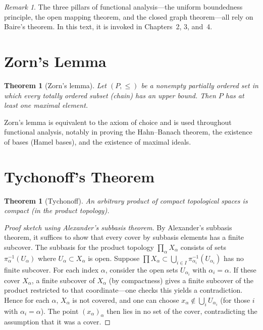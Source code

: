 \documentclass[a4paper,12pt]{book}
\theoremstyle{definition}
\theoremstyle{plain}
\newtheorem{theorem}[definition]{Theorem}
\theoremstyle{remark}
\newtheorem{remark}[definition]{Remark}
\begin{document}
\begin{remark}\label{rem:baire-applications}
The three pillars of functional analysis---the uniform boundedness principle,
the open mapping theorem, and the closed graph theorem---all rely on Baire's
theorem. In this text, it is invoked in Chapters~2, 3, and~4.
\end{remark}


\section{Zorn's Lemma}\label{sec:zorn}


\begin{theorem}[Zorn's lemma]\label{thm:zorn}
Let $(P, \le)$ be a nonempty partially ordered set in which every totally
ordered subset (chain) has an upper bound. Then $P$ has at least one maximal
element.
\end{theorem}

Zorn's lemma is equivalent to the axiom of choice and
is used throughout functional analysis, notably in proving the Hahn--Banach
theorem, the existence of bases (Hamel bases), and the existence of maximal
ideals.


\section{Tychonoff's Theorem}\label{sec:tychonoff}


\begin{theorem}[Tychonoff]\label{thm:tychonoff}
An arbitrary product of compact topological spaces is compact (in the product
topology).
\end{theorem}

\begin{proof}[Proof sketch using Alexander's subbasis theorem]
By Alexander's subbasis theorem, it suffices to show that every cover by
subbasis elements has a finite subcover. The subbasis for the product topology
$\prod_\alpha X_\alpha$ consists of sets $\pi_\alpha^{-1}(U_\alpha)$ where
$U_\alpha \subset X_\alpha$ is open. Suppose $\prod X_\alpha \subset
\bigcup_{i \in I} \pi_{\alpha_i}^{-1}(U_{\alpha_i})$ has no finite subcover.
For each index $\alpha$, consider the open sets $U_{\alpha_i}$ with
$\alpha_i = \alpha$. If these cover $X_\alpha$, a finite subcover of $X_\alpha$
(by compactness) gives a finite subcover of the product restricted to that
coordinate---one checks this yields a contradiction. Hence for each $\alpha$,
$X_\alpha$ is not covered, and one can choose $x_\alpha \notin \bigcup_i U_{\alpha_i}$
(for those $i$ with $\alpha_i = \alpha$). The point $(x_\alpha)_\alpha$ then
lies in no set of the cover, contradicting the assumption that it was a cover.
\end{proof}
\end{document}
